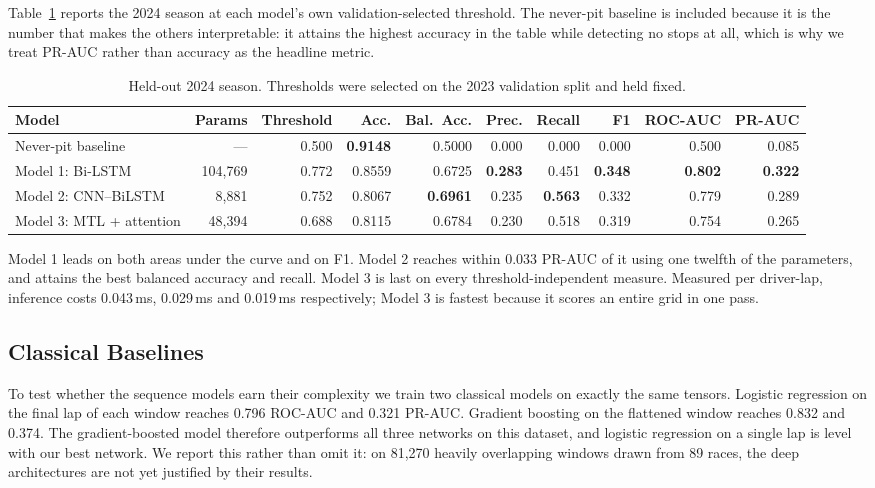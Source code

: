 \documentclass[conference]{IEEEtran}
\begin{document}
Table~\ref{tab:neural} reports the 2024 season at each model's own validation-selected threshold. The never-pit baseline is included because it is the number that makes the others interpretable: it attains the highest accuracy in the table while detecting no stops at all, which is why we treat PR-AUC rather than accuracy as the headline metric.

\begin{table}[t]
\centering
\caption{Held-out 2024 season. Thresholds were selected on the 2023 validation split and held fixed.}
\label{tab:neural}
\small
\setlength{\tabcolsep}{6pt}
\begin{tabular}{lrrrrrrrrr}
\toprule
Model & Params & Threshold & Acc. & Bal.\ Acc. & Prec. & Recall & F1 & ROC-AUC & PR-AUC \\
\midrule
Never-pit baseline            & ---      & 0.500 & \textbf{0.9148} & 0.5000 & 0.000 & 0.000 & 0.000 & 0.500 & 0.085 \\
Model 1: Bi-LSTM              & 104{,}769 & 0.772 & 0.8559 & 0.6725 & \textbf{0.283} & 0.451 & \textbf{0.348} & \textbf{0.802} & \textbf{0.322} \\
Model 2: CNN--BiLSTM          & 8{,}881   & 0.752 & 0.8067 & \textbf{0.6961} & 0.235 & \textbf{0.563} & 0.332 & 0.779 & 0.289 \\
Model 3: MTL + attention      & 48{,}394  & 0.688 & 0.8115 & 0.6784 & 0.230 & 0.518 & 0.319 & 0.754 & 0.265 \\
\bottomrule
\end{tabular}
\end{table}

Model 1 leads on both areas under the curve and on F1. Model 2 reaches within 0.033 PR-AUC of it using one twelfth of the parameters, and attains the best balanced accuracy and recall. Model 3 is last on every threshold-independent measure. Measured per driver-lap, inference costs 0.043\,ms, 0.029\,ms and 0.019\,ms respectively; Model 3 is fastest because it scores an entire grid in one pass.

\subsection{Classical Baselines}
\label{sec:baselines}

To test whether the sequence models earn their complexity we train two classical models on exactly the same tensors. Logistic regression on the final lap of each window reaches 0.796 ROC-AUC and 0.321 PR-AUC. Gradient boosting on the flattened window reaches 0.832 and 0.374. The gradient-boosted model therefore outperforms all three networks on this dataset, and logistic regression on a single lap is level with our best network. We report this rather than omit it: on 81{,}270 heavily overlapping windows drawn from 89 races, the deep architectures are not yet justified by their results.
\end{document}
